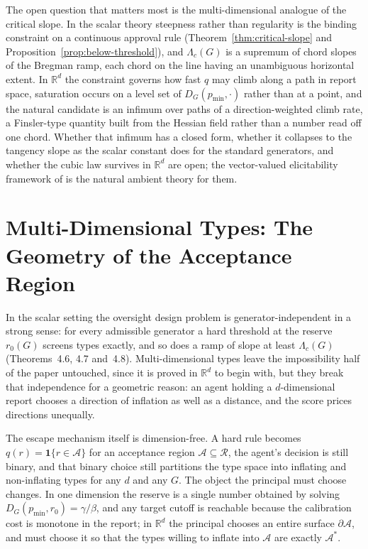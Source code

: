 \documentclass[acmsmall,nonacm,screen]{acmart}
\theoremstyle{acmplain}%
\theoremstyle{acmdefinition}%
\newcommand{\R}{\mathbb{R}}
\newcommand{\calR}{\mathcal{R}}
\numberwithin{equation}{section}
\begin{document}
\begin{appendix}
The open question that matters most is the multi-dimensional analogue of the critical slope. In the scalar theory steepness rather than regularity is the binding constraint on a continuous approval rule (Theorem~\ref{thm:critical-slope} and Proposition~\ref{prop:below-threshold}), and $\Lambda_c(G)$ is a supremum of chord slopes of the Bregman ramp, each chord on the line having an unambiguous horizontal extent. In $\R^d$ the constraint governs how fast $q$ may climb along a path in report space, saturation occurs on a level set of $D_G(p_{\min},\cdot)$ rather than at a point, and the natural candidate is an infimum over paths of a direction-weighted climb rate, a Finsler-type quantity built from the Hessian field rather than a number read off one chord. Whether that infimum has a closed form, whether it collapses to the tangency slope as the scalar constant does for the standard generators, and whether the cubic law survives in $\R^d$ are open; the vector-valued elicitability framework of \citet{fissler2016higher} is the natural ambient theory for them.

\section{Multi-Dimensional Types: The Geometry of the Acceptance Region}\label{sec:multi-dim-geom}

In the scalar setting the oversight design problem is generator-independent in a strong sense: for every admissible generator a hard threshold at the reserve $r_0(G)$ screens types exactly, and so does a ramp of slope at least $\Lambda_c(G)$ (Theorems~4.6, 4.7 and~4.8). Multi-dimensional types leave the impossibility half of the paper untouched, since it is proved in $\R^d$ to begin with, but they break that independence for a geometric reason: an agent holding a $d$-dimensional report chooses a direction of inflation as well as a distance, and the score prices directions unequally.

The escape mechanism itself is dimension-free. A hard rule becomes $q(r) = \mathbf{1}\{r \in \mathcal{A}\}$ for an acceptance region $\mathcal{A} \subseteq \calR$, the agent's decision is still binary, and that binary choice still partitions the type space into inflating and non-inflating types for any $d$ and any $G$. The object the principal must choose changes. In one dimension the reserve is a single number obtained by solving $D_G(p_{\min},r_0) = \gamma/\beta$, and any target cutoff is reachable because the calibration cost is monotone in the report; in $\R^d$ the principal chooses an entire surface $\partial \mathcal{A}$, and must choose it so that the types willing to inflate into $\mathcal{A}$ are exactly $\mathcal{A}^*$.


\end{appendix}
\end{document}
